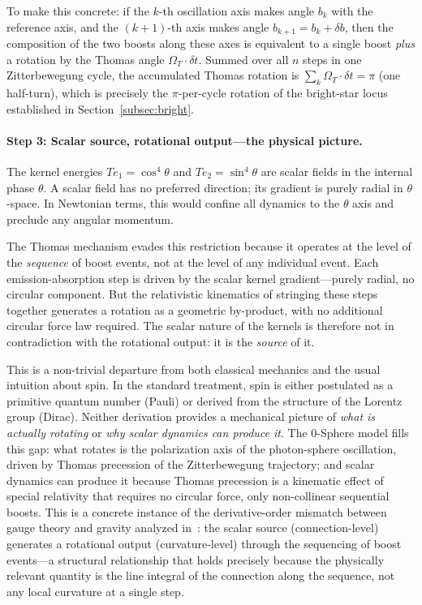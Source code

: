 \documentclass[%
 reprint, amsmath,amssymb, aps, prb, ]{revtex4-2}
\numberwithin{equation}{section}
\newcommand{\iphase}{\theta}
\begin{document}
To make this concrete: if the $k$-th oscillation axis makes angle $b_k$ with the reference axis, and the $(k+1)$-th axis makes angle $b_{k+1} = b_k + \delta b$, then the composition of the two boosts along these axes is equivalent to a single boost \emph{plus} a rotation by the Thomas angle $\Omega_T \cdot \delta t$.
Summed over all $n$ steps in one Zitterbewegung cycle, the accumulated Thomas rotation is $\sum_k \Omega_T \cdot \delta t = \pi$ (one half-turn), which is precisely the $\pi$-per-cycle rotation of the bright-star locus established in Section~\ref{subsec:bright}.

\paragraph{Step 3: Scalar source, rotational output---the physical picture.}
The kernel energies $Te_1 = \cos^4\iphase$ and $Te_2 = \sin^4\iphase$ are scalar fields in the internal phase $\iphase$.
A scalar field has no preferred direction; its gradient is purely radial in $\iphase$-space.
In Newtonian terms, this would confine all dynamics to the $\iphase$ axis and preclude any angular momentum.

The Thomas mechanism evades this restriction because it operates at the level of the \emph{sequence} of boost events, not at the level of any individual event.
Each emission-absorption step is driven by the scalar kernel gradient---purely radial, no circular component.
But the relativistic kinematics of stringing these steps together generates a rotation as a geometric by-product, with no additional circular force law required.
The scalar nature of the kernels is therefore not in contradiction with the rotational output: it is the \emph{source} of it.

This is a non-trivial departure from both classical mechanics and the usual intuition about spin.
In the standard treatment, spin is either postulated as a primitive quantum number (Pauli) or derived from the structure of the Lorentz group (Dirac).
Neither derivation provides a mechanical picture of \emph{what is actually rotating} or \emph{why scalar dynamics can produce it}.
The 0-Sphere model fills this gap: what rotates is the polarization axis of the photon-sphere oscillation, driven by Thomas precession of the Zitterbewegung trajectory; and scalar dynamics can produce it because Thomas precession is a kinematic effect of special relativity that requires no circular force, only non-collinear sequential boosts. This is a concrete instance of the derivative-order mismatch between gauge theory and gravity analyzed in~\cite{hanamura40}: the scalar source (connection-level) generates a rotational output (curvature-level) through the sequencing of boost events---a structural relationship that holds precisely because the physically relevant quantity is the line integral of the connection along the sequence, not any local curvature at a single step.
\end{document}
